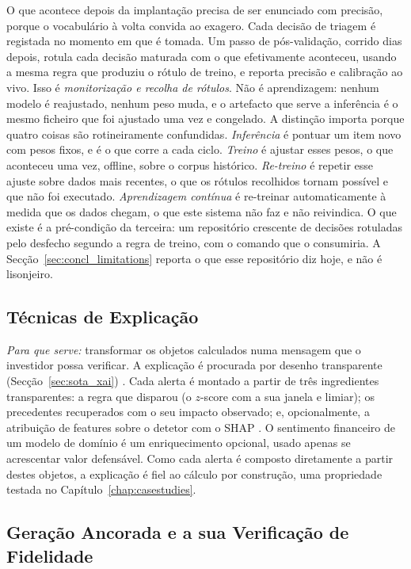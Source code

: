 O que acontece depois da implantação precisa de ser enunciado com precisão, porque o vocabulário à volta
convida ao exagero. Cada decisão de triagem é registada no momento em que é tomada. Um passo de
pós-validação, corrido dias depois, rotula cada decisão maturada com o que efetivamente aconteceu, usando
a mesma regra que produziu o rótulo de treino, e reporta precisão e calibração ao vivo. Isso é
\emph{monitorização e recolha de rótulos}. Não é aprendizagem: nenhum modelo é reajustado, nenhum peso
muda, e o artefacto que serve a inferência é o mesmo ficheiro que foi ajustado uma vez e congelado. A
distinção importa porque quatro coisas são rotineiramente confundidas. \emph{Inferência} é pontuar um item
novo com pesos fixos, e é o que corre a cada ciclo. \emph{Treino} é ajustar esses pesos, o que aconteceu
uma vez, offline, sobre o corpus histórico. \emph{Re-treino} é repetir esse ajuste sobre dados mais
recentes, o que os rótulos recolhidos tornam possível e que não foi executado. \emph{Aprendizagem
contínua} é re-treinar automaticamente à medida que os dados chegam, o que este sistema não faz e não
reivindica. O que existe é a pré-condição da terceira: um repositório crescente de decisões rotuladas pelo
desfecho segundo a regra de treino, com o comando que o consumiria. A
Secção~\ref{sec:concl_limitations} reporta o que esse repositório diz hoje, e não é lisonjeiro.

\subsection{Técnicas de Explicação}
\label{sec:met_xai}

\emph{Para que serve:} transformar os objetos calculados numa mensagem que o investidor possa verificar. A
explicação é procurada por desenho transparente (Secção~\ref{sec:sota_xai})
\autocite{rudin2019stop, arrieta2020xai}. Cada alerta é montado a partir de três ingredientes
transparentes: a regra que disparou (o $z$-score com a sua janela e limiar); os precedentes recuperados com
o seu impacto observado; e, opcionalmente, a atribuição de features sobre o detetor com o SHAP
\autocite{lundberg2017shap}. O sentimento financeiro de um modelo de domínio \autocite{araci2019finbert} é
um enriquecimento opcional, usado apenas se acrescentar valor defensável. Como cada alerta é composto
diretamente a partir destes objetos, a explicação é fiel ao cálculo por construção, uma propriedade testada
no Capítulo~\ref{chap:casestudies}.

\subsection{Geração Ancorada e a sua Verificação de Fidelidade}
\label{sec:met_generation}

